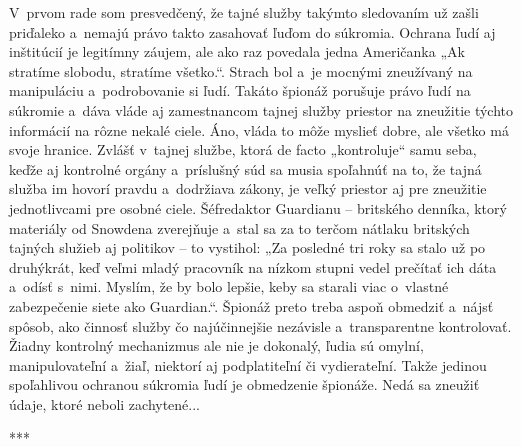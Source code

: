 \documentclass{article}
\begin{document}
V~prvom rade som presvedčený, že tajné služby takýmto sledovaním už zašli priďaleko a~nemajú právo takto zasahovať ľuďom do súkromia. Ochrana ľudí aj inštitúcií je legitímny záujem, ale ako raz povedala jedna Američanka „Ak stratíme slobodu, stratíme všetko.“. Strach bol a~je mocnými zneužívaný na manipuláciu a~podrobovanie si ľudí. Takáto špionáž porušuje právo ľudí na súkromie a~dáva vláde aj zamestnancom tajnej služby priestor na zneužitie týchto informácií na rôzne nekalé ciele. Áno, vláda to môže myslieť dobre, ale všetko má svoje hranice. Zvlášť v~tajnej službe, ktorá de facto „kontroluje“ samu seba, keďže aj kontrolné orgány a~príslušný súd sa musia spoľahnúť na to, že tajná služba im hovorí pravdu a~dodržiava zákony, je veľký priestor aj pre zneužitie jednotlivcami pre osobné ciele. Šéfredaktor Guardianu – britského denníka, ktorý materiály od Snowdena zverejňuje a~stal sa za to terčom nátlaku britských tajných služieb aj politikov – to vystihol: „Za posledné tri roky sa stalo už po druhýkrát, keď veľmi mladý pracovník na nízkom stupni vedel prečítať ich dáta a~odísť s~nimi. Myslím, že by bolo lepšie, keby sa starali viac o~vlastné zabezpečenie siete ako Guardian.“. Špionáž preto treba aspoň obmedziť a~nájsť spôsob, ako činnosť služby čo najúčinnejšie nezávisle a~transparentne kontrolovať. Žiadny kontrolný mechanizmus ale nie je dokonalý, ľudia sú omylní, manipulovateľní a~žiaľ, niektorí aj podplatiteľní či vydierateľní. Takže jedinou spoľahlivou ochranou súkromia ľudí je obmedzenie špionáže. Nedá sa zneužiť údaje, ktoré neboli zachytené...

\begin{center}
	***
\end{center}
\end{document}
